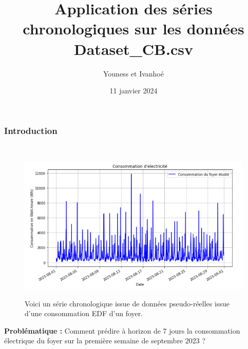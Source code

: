 \documentclass{beamer}
\title{Application des séries chronologiques sur les données Dataset\_CB.csv}
\author{Youness et Ivanhoé}
\date{11 janvier 2024}
\theoremstyle{definition}
\begin{document}
\begin{frame}[plain]
    \maketitle
\end{frame}


\begin{frame}
\frametitle{Introduction}
\hfill\\[-0.75cm]
\begin{figure}
	\centering
	\includegraphics[scale=0.35]{1.png}\\[-0.25cm]
	\caption*{Voici un série chronologique issue de données pseudo-réelles issue d'une consommation EDF d'un foyer.}
\end{figure}

\textcolor{modernvert}{\textbf{Problématique :}} Comment prédire à horizon de 7 jours la
consommation électrique du foyer sur la première semaine de septembre 2023 ?
\end{frame}

\begin{frame}
	\tableofcontents
\end{frame}
\end{document}
